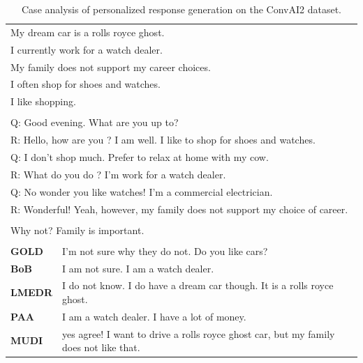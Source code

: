 \documentclass[letterpaper]{article} %
\begin{document}

\begin{table}[ht]
\centering
\def\arraystretch{1.2}%
\begin{tabular}{|l|p{11cm}|}

\hline
\rowcolor{yellow}
\multicolumn{2}{|c|}{\textbf{Persona}} \\
\hline
\multicolumn{2}{|l|}{My dream car is a rolls royce ghost.} \\
\multicolumn{2}{|l|}{I currently work for a watch dealer.} \\
\multicolumn{2}{|l|}{My family does not support my career choices.} \\
\multicolumn{2}{|l|}{I often shop for shoes and watches.} \\
\multicolumn{2}{|l|}{I like shopping.} \\
\hline

\rowcolor{yellow}
\multicolumn{2}{|c|}{\textbf{Context}} \\
\hline
\multicolumn{2}{|l|}{Q: Good evening. What are you up to?} \\
\multicolumn{2}{|l|}{R: Hello, how are you ? I am well. I like to shop for shoes and watches.} \\
\multicolumn{2}{|l|}{Q: I don't shop much. Prefer to relax at home with my cow.} \\
\multicolumn{2}{|l|}{R: What do you do ? I'm work for a watch dealer.} \\
\multicolumn{2}{|l|}{Q: No wonder you like watches! I'm a commercial electrician.} \\
\multicolumn{2}{|l|}{R: Wonderful! Yeah, however, my family does not support my choice of career.} \\
\hline

\rowcolor{yellow}
\multicolumn{2}{|c|}{\textbf{Query}} \\
\hline
\multicolumn{2}{|l|}{Why not? Family is important.} \\

\hhline{|==|}
\rowcolor[RGB]{204,217,245}
\multicolumn{2}{|c|}{\textbf{Response}} \\
\hhline{|==|}
\textbf{GOLD} & I'm not sure why they do not. Do you like cars? \\
\textbf{BoB} & I am not sure. I am a watch dealer. \\
\textbf{LMEDR} & I do not know. I do have a dream car though. It is a rolls royce ghost. \\
\textbf{PAA} & I am a watch dealer. I have a lot of money. \\
\textbf{MUDI} & yes agree! I want to drive a rolls royce ghost car, but my family does not like that. \\

\hline
\end{tabular}
\caption{Case analysis of personalized response generation on the ConvAI2 dataset.}
\label{table:case_study_2}
\end{table}
\end{document}
